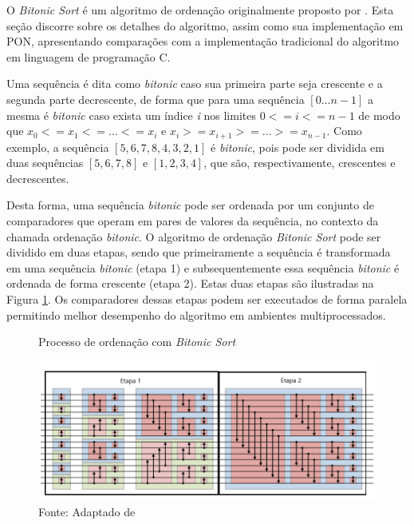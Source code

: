 O \textit{Bitonic Sort} é um algoritmo de ordenação originalmente proposto por
. Esta seção discorre sobre os detalhes do algoritmo,
assim como sua implementação em PON, apresentando comparações com a
implementação tradicional do algoritmo em linguagem de programação C.

Uma sequência é dita como \textit{bitonic} caso sua primeira parte seja
crescente e a segunda parte decrescente, de forma que para uma sequência \([0
... n-1]\) a mesma é \textit{bitonic} caso exista um índice \textit{i} nos
limites \(0<=i<=n-1\) de modo que \(x_0 <= x_1 <= ... <= x_i\) e \(x_i >=
x_{i+1} >= ... >= x_{n-1}\). Como exemplo, a sequência \([5, 6, 7, 8, 4, 3, 2,
1]\) é \textit{bitonic}, pois pode ser dividida em duas sequências \([5, 6, 7,
8]\) e \([1, 2, 3, 4]\), que são, respectivamente, crescentes e decrescentes.

Desta forma, uma sequência \textit{bitonic} pode ser ordenada por um conjunto de
comparadores que operam em pares de valores da sequência, no contexto da chamada
ordenação \textit{bitonic}. O algoritmo de ordenação \textit{Bitonic Sort} pode
ser dividido em duas etapas, sendo que primeiramente a sequência é transformada
em uma sequência \textit{bitonic} (etapa 1) e subsequentemente essa sequência
\textit{bitonic} é ordenada de forma crescente (etapa 2). Estas duas etapas são
ilustradas na Figura \ref{fig:bitonic_order}. Os comparadores dessas etapas
podem ser executados de forma paralela permitindo melhor desempenho do algoritmo
em ambientes multiprocessados.

\begin{figure}[!htb]
\centering
\caption{Processo de ordenação com \textit{Bitonic Sort}} \includegraphics[width=\textwidth]{../figures/bitonic_sort_mod.png}
\smallskip
\caption*{Fonte:
Adaptado de }
\label{fig:bitonic_order}
\end{figure}

\FloatBarrier

